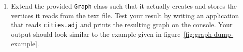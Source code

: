 \documentclass[a4paper,10pt]{article}
\begin{document}
\begin{enumerate}

\item
  Extend the provided \texttt{Graph} class such that it actually creates and stores the vertices it reads from the text file.
  Test your result by writing an application that reads \texttt{cities.adj} and prints the resulting graph on the console.
  Your output should look similar to the example given in figure~\ref{fig:graph-dump-example}.
  
\end{enumerate}



\footnotesize


\end{document}
